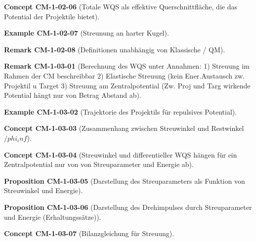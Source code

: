 \documentclass[10pt, letterpaper]{article}
\newcommand{\CustomHeading}[3]{%
  \par\medskip\noindent%
  \textbf{#1 #2} \textnormal{(#3)}.\enskip%
}
\newenvironment{PROP}[2]{\CustomHeading{Proposition}{#1}{#2}}{}
\newenvironment{REM}[2]{\CustomHeading{Remark}{#1}{#2}}{}
\newenvironment{EXA}[2]{\CustomHeading{Example}{#1}{#2}}{}
\newenvironment{CONC}[2]{\CustomHeading{Concept}{#1}{#2}}{}
\begin{document}
\begin{CONC}{CM-1-02-06}{Totale WQS als effektive Querschnittfläche, die das Potential der Projektile bietet}
\end{CONC}

\begin{EXA}{CM-1-02-07}{Streunung an harter Kugel}
\end{EXA}

\begin{REM}{CM-1-02-08}{Definitionen unabhängig von Klassische / QM}
\end{REM}

\begin{REM}{CM-1-03-01}{Berechnung des WQS unter Annahmen:
1) Streuung im Rahmen der CM beschreibbar
2) Elastische Streuung (kein Ener.Austausch zw. Projektil u Target
3) Streuung am Zentralpotential (Zw. Proj und Targ wirkende Potential hängt nur von Betrag Abstand ab}
\end{REM}

\begin{EXA}{CM-1-03-02}{Trajektorie des Projektils für repulsives Potential}
\end{EXA}

\begin{CONC}{CM-1-03-03}{Zusammenhang zwischen Streuwinkel und Restwinkel $/phi_inf$}
\end{CONC}

\begin{CONC}{CM-1-03-04}{Streuwinkel und differentieller WQS hängen für ein Zentralpotential nur von von Streuparameter und Energie ab}
\end{CONC}

\begin{PROP}{CM-1-03-05}{Darstellung des Streuparameters als Funktion von Streuwinkel und Energie}
\end{PROP}

\begin{PROP}{CM-1-03-06}{Darstellung des Drehimpulses durch Streuparameter und Energie (Erhaltungssätze)}
\end{PROP}

\begin{CONC}{CM-1-03-07}{Bilanzgleichung für Streuung}
\end{CONC}
\end{document}
